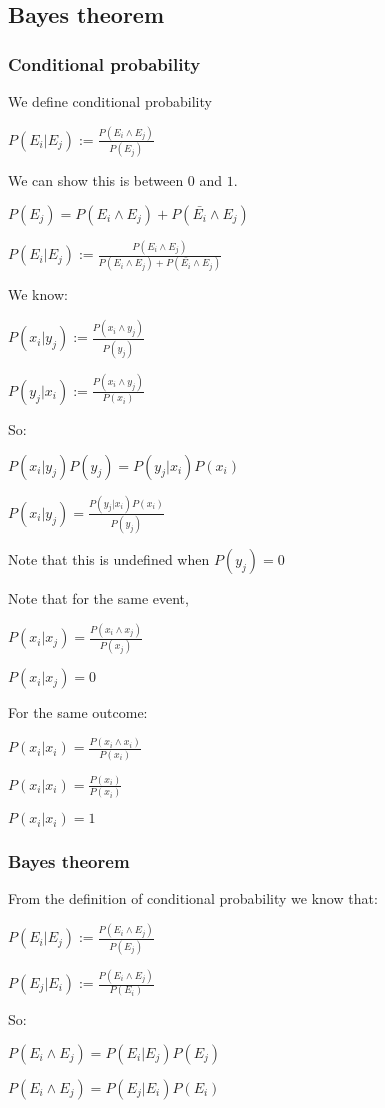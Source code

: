 
\subsection{Bayes theorem}

\subsubsection{Conditional probability}

We define conditional probability

\(P(E_i|E_j):=\frac{P(E_i\land E_j)}{P(E_j)}\)

We can show this is between \(0\) and \(1\).

\(P(E_j)=P(E_i\land E_j)+P(\bar{E_i}\land E_j)\)

\(P(E_i|E_j):=\frac{P(E_i\land E_j)}{ P(E_i\land E_j)+P(\bar{E_i}\land E_j)}\)

We know:

\(P(x_i|y_j):=\frac{P(x_i \land y_j)}{P(y_j)}\)

\(P(y_j|x_i):=\frac{P(x_i \land y_j)}{P(x_i)}\)

So:

\(P(x_i|y_j)P(y_j)=P(y_j|x_i) P(x_i)\)

\(P(x_i|y_j)=\frac{P(y_j|x_i) P(x_i)}{P(y_j)}\)

Note that this is undefined when \(P(y_j)=0\)

Note that for the same event, 

\(P(x_i|x_j)=\frac{P(x_i\land x_j)}{P(x_j)}\)

\(P(x_i|x_j)=0\)

For the same outcome:

\(P(x_i|x_i)=\frac{P(x_i\land x_i)}{P(x_i)}\)

\(P(x_i|x_i)=\frac{P(x_i)}{P(x_i)}\)

\(P(x_i|x_i)=1\)

\subsubsection{Bayes theorem}

From the definition of conditional probability we know that:

\(P(E_i|E_j):=\frac{P(E_i\land E_j)}{P(E_j)}\)

\(P(E_j|E_i):=\frac{P(E_i\land E_j)}{P(E_i)}\)

So:

\(P(E_i\land E_j)=P(E_i|E_j)P(E_j)\)

\(P(E_i\land E_j)=P(E_j|E_i)P(E_i)\)


